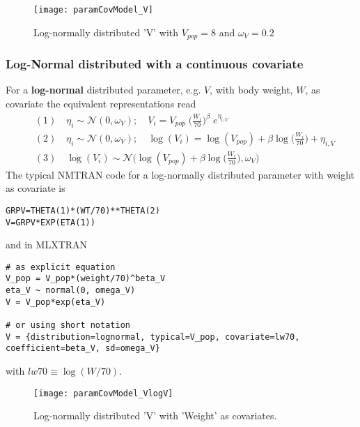\begin{figure}[htbp]
\centering
 \texttt{[image: paramCovModel\_V]}
\caption{Log-normally distributed 'V' with $V_{pop}=8$ and $\omega_V=0.2$}
\label{fig:parameterCovModel0}
\end{figure}



\subsubsection{Log-Normal distributed with a continuous covariate}
For a \textbf{log-normal} distributed parameter, e.g. $V$, with body weight, $W$, as covariate the equivalent representations read
\begin{align*}
& (1) \quad \eta_i \sim \mathcal{N}(0,\omega_V); \quad V_i= V_{pop} \; \big(\frac{W_i}{70}\big)^\beta \; e^{\eta_{i,V}}   \\
&(2) \quad \eta_i \sim \mathcal{N}(0,\omega_V); \quad \log( V_i ) = \log( V_{pop} ) + \beta \log\big(\frac{W_i}{70}\big) + \eta_{i,V}  \\
&(3) \quad \log( V_i ) \sim \mathcal{N}\big( \log( V_{pop} )+ \beta\log\Big(\frac{W_i}{70}\Big),\omega_V\big)
\end{align*}
The typical NMTRAN code for a log-normally distributed parameter with weight as covariate is
\begin{lstlisting}
GRPV=THETA(1)*(WT/70)**THETA(2)
V=GRPV*EXP(ETA(1))
\end{lstlisting}
and in MLXTRAN
\begin{lstlisting}
# as explicit equation
V_pop = V_pop*(weight/70)^beta_V
eta_V ~ normal(0, omega_V)
V = V_pop*exp(eta_V)

# or using short notation
V = {distribution=lognormal, typical=V_pop, covariate=lw70, coefficient=beta_V, sd=omega_V}
\end{lstlisting}
with $lw70 \equiv \log(W/70)$.

\begin{figure}[htbp]
\centering
 \texttt{[image: paramCovModel\_VlogV]}
\caption{Log-normally distributed 'V' with 'Weight' as covariates.}
\label{fig:parameterCovModel1}
\end{figure}



